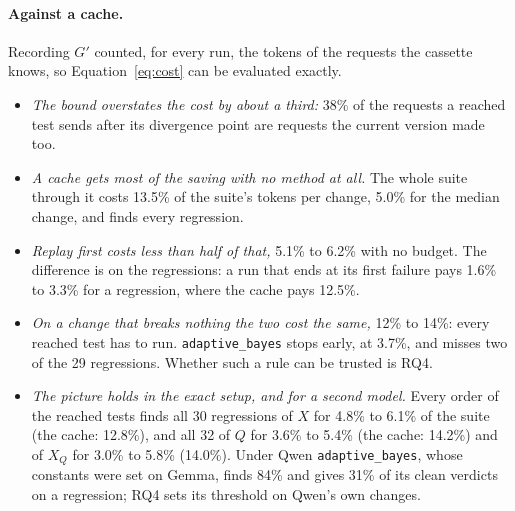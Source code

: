 \documentclass[11pt,a4paper]{article}
\newcommand{\strat}[1]{\texttt{#1}}
\begin{document}
\paragraph{Against a cache.} Recording $G'$ counted, for every run, the tokens of the requests the cassette knows,
so Equation~\ref{eq:cost} can be evaluated exactly.
\begin{itemize}
  \item \emph{The bound overstates the cost by about a third:} 38\% of the requests a reached test sends after its
        divergence point are requests the current version made too.
  \item \emph{A cache gets most of the saving with no method at all.} The whole suite through it costs 13.5\% of
        the suite's tokens per change, 5.0\% for the median change, and finds every regression.
  \item \emph{Replay first costs less than half of that,} 5.1\% to 6.2\% with no budget. The difference is on the
        regressions: a run that ends at its first failure pays 1.6\% to 3.3\% for a regression, where the cache
        pays 12.5\%.
  \item \emph{On a change that breaks nothing the two cost the same,} 12\% to 14\%: every reached test has to run.
        \strat{adaptive\_bayes} stops early, at 3.7\%, and misses two of the 29 regressions. Whether such a rule
        can be trusted is RQ4.
  \item \emph{The picture holds in the exact setup, and for a second model.} Every order of the reached tests
        finds all 30 regressions of $X$ for 4.8\% to 6.1\% of the suite (the cache: 12.8\%), and all 32 of $Q$ for
        3.6\% to 5.4\% (the cache: 14.2\%) and of $X_Q$ for 3.0\% to 5.8\% (14.0\%). Under Qwen
        \strat{adaptive\_bayes}, whose constants were set on Gemma, finds 84\% and gives 31\% of its clean
        verdicts on a regression; RQ4 sets its threshold on Qwen's own changes.
\end{itemize}
\end{document}
